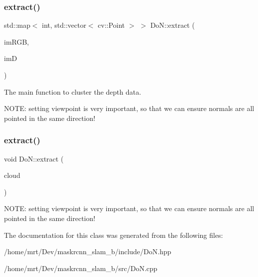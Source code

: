 \subsubsection{\texorpdfstring{extract()}{extract()}\hspace{0.1cm}{\footnotesize\ttfamily [1/2]}}
{\footnotesize\ttfamily std\+::map$<$ int, std\+::vector$<$ cv\+::\+Point $>$ $>$ Do\+N\+::extract (\begin{DoxyParamCaption}\item[{cv\+::\+Mat \&}]{im\+R\+GB,  }\item[{cv\+::\+Mat \&}]{imD }\end{DoxyParamCaption})}



The main function to cluster the depth data. 

N\+O\+TE\+: setting viewpoint is very important, so that we can ensure normals are all pointed in the same direction!\mbox{\label{classDoN_ad64458603d62f8a04298520cb747b90e}} 
\subsubsection{\texorpdfstring{extract()}{extract()}\hspace{0.1cm}{\footnotesize\ttfamily [2/2]}}
{\footnotesize\ttfamily void Do\+N\+::extract (\begin{DoxyParamCaption}\item[{pcl\+::\+Point\+Cloud$<$ pcl\+::\+Point\+X\+Y\+ZI $>$\+::Ptr}]{cloud }\end{DoxyParamCaption})}

N\+O\+TE\+: setting viewpoint is very important, so that we can ensure normals are all pointed in the same direction!

The documentation for this class was generated from the following files\+:\begin{DoxyCompactItemize}
\item 
/home/mrt/\+Dev/maskrcnn\+\_\+slam\+\_\+b/include/Do\+N.\+hpp\item 
/home/mrt/\+Dev/maskrcnn\+\_\+slam\+\_\+b/src/Do\+N.\+cpp\end{DoxyCompactItemize}
